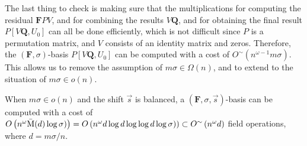 The last thing to check is making sure that the multiplications for
computing the residual $\mathbf{F}PV$, and for combining the results
$V\mathbf{Q}$, and for obtaining the final result $P\left[V\mathbf{Q},U_{0}\right]$
can all be done efficiently, which is not difficult since $P$ is
a permutation matrix, and $V$ consists of an identity matrix and
zeros. Therefore, the $(\mathbf{F},\sigma)$-basis $P\left[V\mathbf{Q},U_{0}\right]$
can be computed with a cost of $O^{\sim}\left(n^{\omega-1}m\sigma\right)$.
This allows us to remove the assumption of $m\sigma\in\Omega(n)$,
and to extend  to the situation of $m\sigma\in o(n)$.
\begin{thm}
\label{thm:orderBasisCostCeilingRemoved}When $m\sigma\in o(n)$ and
the shift $\vec{s}$ is balanced, a $\left(\mathbf{F},\sigma,\vec{s}\right)$-basis
can be computed with a cost of $O\left(n^{\omega}\bar{\M}(d)\log\sigma)\right)=O\left(n^{\omega}d\log d\log\log d\log\sigma)\right)\subset O^{\sim}\left(n^{\omega}d\right)$
field operations, where $d=m\sigma/n$. %
\begin{comment}
Should easily work for the second unbalanced case as well. But need
to write it out.
\end{comment}
\end{thm}

